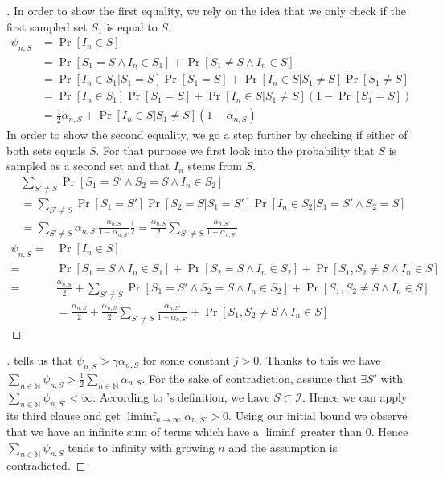 \begin{proof}[]
  In order to show the first equality, we rely on the idea that we only check if the first sampled set $S_1$ is equal to $S$.
  \begin{align}
    \psi_{n, S} &= \Pr[I_n \in S] \\
    &= \Pr[S_1 = S \wedge I_n \in S_1] + \Pr[S_1 \neq S \wedge I_n \in S] \\
    &= \Pr[I_n \in S_1 | S_1 = S] \Pr[S_1 = S] + \Pr[I_n \in S| S_1 \neq S]\Pr[S_1 \neq S] \\
    &= \Pr[I_n \in S_1] \Pr[S_1 = S] + \Pr[I_n \in S| S_1 \neq S](1 - \Pr[S_1 = S]) \\
    &= \frac{1}{2} \alpha_{n, S} +  \Pr[I_n \in S | S_1 \neq S] (1 - \alpha_{n, S})
  \end{align}
  In order to show the second equality, we go a step further by checking if either of both sets equals $S$. For that purpose we first look into the probability that $S$ is sampled as a second set and that $I_n$ stems from $S$.
  \begin{align}
    & \sum_{S'\neq S}\Pr[S_1 = S' \wedge S_2 = S \wedge I_n \in S_2] \\
    &= \sum_{S'\neq S} \Pr[S_1 = S'] \Pr[S_2 = S | S_1 = S'] \Pr[I_n \in S_2 | S_1 = S' \wedge S_2 = S] \\
    &= \sum_{S'\neq S} \alpha_{n, S'} \frac{\alpha_{n, S}}{1 - \alpha_{n, S'}} \frac{1}{2} = \frac{\alpha_{n, S}}{2} \sum_{S'\neq S} \frac{\alpha_{n, S'}}{1 - \alpha_{n, S'}}
  \end{align}
  \begin{align}
    \psi_{n, S} =& \Pr[I_n \in S] \\
    =& \Pr[S_1 = S \wedge I_n \in S_1] + \Pr[S_2 = S \wedge I_n \in S_2] +  \Pr[S_1, S_2 \neq S \wedge I_n \in S]\\
    =& \frac{\alpha_{n, S}}{2} + \sum_{S'\neq S}\Pr[S_1 = S' \wedge S_2 = S \wedge I_n \in S_2] +  \Pr[S_1, S_2 \neq S \wedge I_n \in S] \\
    &= \frac{\alpha_{n, S}}{2} +  \frac{\alpha_{n, S}}{2} \sum_{S'\neq S} \frac{\alpha_{n, S'}}{1 - \alpha_{n, S'}} + \Pr[S_1, S_2 \neq S \wedge I_n \in S]
    \end{align}
\end{proof}

\begin{proof}[]
   tells us that $\psi_{n, S} > \gamma \alpha_{n, S}$ for some constant $j > 0$. Thanks to this we have $\sum_{n \in \mathbb{N}} \psi_{n, S} > \frac{1}{2} \sum_{n \in \mathbb{N}} \alpha_{n, S}$. For the sake of contradiction, assume that $\exists S'$ with $\sum_{n \in \mathbb{N}} \psi_{n, S'} < \infty$. According to 's definition, we have $S \subset \mathcal{I}$. Hence we can apply its third clause and get $\liminf_{n \rightarrow \infty} \alpha_{n, S'} > 0$. Using our initial bound we observe that we have an infinite sum of terms which have a $\liminf$ greater than 0. Hence $\sum_{n \in \mathbb{N}} \psi_{n, S}$ tends to infinity with growing $n$ and the assumption is contradicted.
\end{proof}

